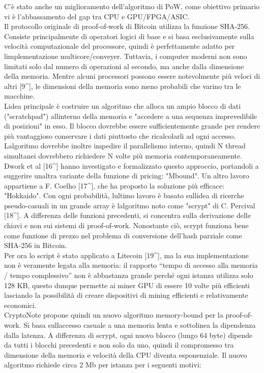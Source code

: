 \documentclass[
]{article}
\begin{document}
C'è stato anche un miglioramento dell'algoritmo di PoW, come obiettivo
primario vi è l'abbassamento del gap tra CPU e GPU/FPGA/ASIC.\\
Il protocollo originale di proof-of-work di Bitcoin utilizza la funzione
SHA-256.\\
Consiste principalmente di operatori logici di base e si basa
esclusivamente sulla velocità computazionale del processore, quindi è
perfettamente adatto per l\textquotesingle implementazione
multicore/conveyer. Tuttavia, i computer moderni non sono limitati solo
dal numero di operazioni al secondo, ma anche dalla dimensione della
memoria. Mentre alcuni processori possono essere notevolmente più veloci
di altri {[}9\^{}{]}, le dimensioni della memoria sono meno probabili
che varino tra le macchine.\\
L\textquotesingle idea principale è costruire un algoritmo che alloca un
ampio blocco di dati ("scratchpad") all\textquotesingle interno della
memoria e "accedere a una sequenza imprevedibile di posizioni" in esso.
Il blocco dovrebbe essere sufficientemente grande per rendere più
vantaggioso conservare i dati piuttosto che ricalcolarli ad ogni
accesso. L\textquotesingle algoritmo dovrebbe inoltre impedire il
parallelismo interno, quindi N thread simultanei dovrebbero richiedere N
volte più memoria contemporaneamente.\\
Dwork et al {[}16\^{}{]} hanno investigato e formalizzato questo
approccio, portandoli a suggerire un\textquotesingle altra variante
della funzione di pricing: "Mbound". Un altro lavoro appartiene a F.
Coelho {[}17\^{}{]}, che ha proposto la soluzione più efficace:
"Hokkaido". Con ogni probabilità, l\textquotesingle ultimo lavoro è
basato sull\textquotesingle idea di ricerche pseudo-casuali in un grande
array è l\textquotesingle algoritmo noto come "scrypt" di C. Percival
{[}18\^{}{]}. A differenza delle funzioni precedenti, si concentra sulla
derivazione delle chiavi e non sui sistemi di proof-of-work. Nonostante
ciò, scrypt funziona bene come funzione di prezzo nel problema di
conversione dell'hash parziale come SHA-256 in Bitcoin.\\
Per ora lo script è stato applicato a Litecoin {[}19\^{}{]}, ma la sua
implementazione non è veramente legata alla memoria: il rapporto ``tempo
di accesso alla memoria / tempo complessivo'' non è abbastanza grande
perché ogni istanza utilizza solo 128 KB, questo dunque permette ai
miner GPU di essere 10 volte più efficienti lasciando la possibilità di
creare dispositivi di mining efficienti e relativamente economici.\\
CryptoNote propone quindi un nuovo algoritmo memory-bound per la
proof-of-work. Si basa sull\textquotesingle accesso casuale a una
memoria lenta e sottolinea la dipendenza dalla latenza. A differenza di
scrypt, ogni nuovo blocco (lungo 64 byte) dipende da tutti i blocchi
precedenti e non solo da uno, quindi il compromesso tra dimensione della
memoria e velocità della CPU diventa esponenziale. Il nuovo algoritmo
richiede circa 2 Mb per istanza per i seguenti motivi:
\end{document}
